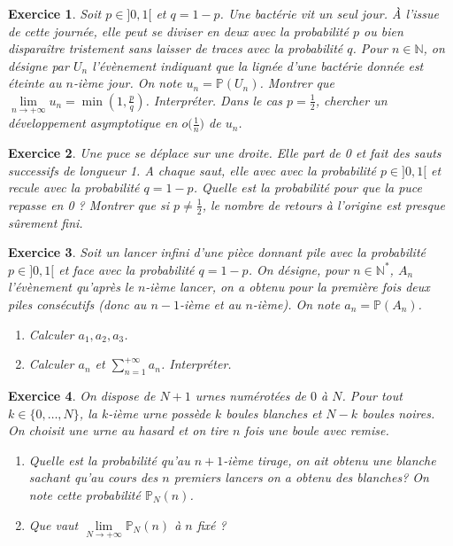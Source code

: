 \documentclass[12pt]{article}
\newtheorem{exercise}{Exercice}[section]
\theoremstyle{remark}
\theoremstyle{remark}
\newcommand{\N}{\mathbb{N}} \newcommand{\Z}{\mathbb{Z}}
\renewcommand{\P}{\mathbb{P}} \newcommand{\im}{\emph{Im}}
\begin{document}
\begin{exercise}
	Soit $p\in]0,1[$ et $q=1-p$. Une bactérie vit un seul jour. \`A l'issue de
	cette journée, elle peut se diviser en deux avec la probabilité $p$ ou bien
	disparaître tristement sans laisser de traces avec la probabilité $q$. Pour
	$n\in\N$, on désigne par $U_{n}$ l'évènement indiquant que la lignée d'une
	bactérie donnée est éteinte au $n$-ième jour. On note $u_{n}=\P(U_{n})$.
	Montrer que $\lim\limits_{n\to+\infty}u_{n}=\min(1,\frac{p}{q})$. Interpréter.
	Dans le cas $p=\frac{1}{2}$, chercher un développement asymptotique en
	$o\bigl(\frac{1}{n}\bigr)$ de $u_{n}$.
\end{exercise}

\begin{exercise}
	Une puce se déplace sur une droite. Elle part de 0 et fait des sauts
	successifs de longueur 1. A chaque saut, elle avec avec la probabilité
	$p\in]0,1[$ et recule avec la probabilité $q=1-p$. Quelle est la probabilité
	pour que la puce repasse en 0 ? Montrer que si $p\neq\frac{1}{2}$, le nombre
	de retours à l'origine est presque sûrement fini.
\end{exercise}

\begin{exercise}
	Soit un lancer infini d'une pièce donnant pile avec la probabilité $p\in]0,1[$
	et face avec la probabilité $q=1-p$. On désigne, pour $n\in\N^{*}$, $A_{n}$
	l'évènement qu'après le $n$-ième lancer, on a obtenu pour la première fois
	deux piles consécutifs (donc au $n-1$-ième et au $n$-ième). On note
	$a_{n}=\P(A_{n})$.
	
	\begin{enumerate}
		\item
		Calculer $a_{1},a_{2},a_{3}$.
		\item
		Calculer $a_{n}$ et $\sum_{n=1}^{+\infty}a_{n}$. Interpréter.
	\end{enumerate}
\end{exercise}

\begin{exercise}
	On dispose de $N+1$ urnes numérotées de $0$ à $N$. Pour tout
	$k\in\{0,\dots,N\}$, la $k$-ième urne possède $k$ boules blanches et $N-k$
	boules noires. On choisit une urne au hasard et on tire $n$ fois une boule
	avec remise.
	\begin{enumerate}
		\item
		Quelle est la probabilité qu'au $n+1$-ième tirage, on ait obtenu une
		blanche sachant qu'au cours des $n$ premiers lancers on a obtenu des
		blanches? On note cette probabilité $\P_{N}(n)$.
		\item
		Que vaut $\lim\limits_{N\to+\infty}\P_{N}(n)$ à $n$ fixé ?
	\end{enumerate}
\end{exercise}
\end{document}
